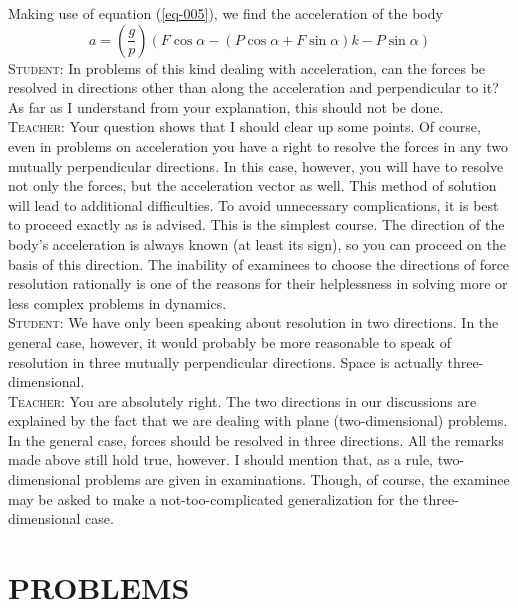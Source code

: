 \documentclass[a4paper,sfsidenotes]{tufte-book}
\begin{document}
Making use of equation (\ref{eq-005}), we find the acceleration of the body
\\
$$
a = \left( \frac{g}{p} \right) \left(F \cos \alpha - \left(P \cos \alpha + F \sin \alpha \right) k - P \sin \alpha \right) 
$$
\textsc{Student:} In problems of this kind dealing with acceleration, can the forces be resolved in directions other than along the acceleration and perpendicular to it? As far as I understand from your explanation, this should not be done.
\\
\textsc{Teacher:} Your question shows that I should clear up some points. Of course, even in problems on acceleration you have a right to resolve the forces in any two mutually perpendicular directions. In this case, however, you will have to resolve not only the forces, but the acceleration vector as well. This method of solution will lead to additional difficulties. To avoid unnecessary complications, it is best to proceed exactly as is advised. This is the simplest course. The direction of the body's acceleration is always known (at least its sign), so you can proceed on the basis of this direction. The inability of examinees to choose the directions of force resolution rationally is one of the reasons for their helplessness in solving more or less complex problems in dynamics.
\\
\textsc{Student:} We have only been speaking about resolution in two directions. In the general case, however, it would probably be more reasonable to speak of resolution in three mutually perpendicular directions. Space is actually three-dimensional.
\\
\textsc{Teacher:} You are absolutely right. The two directions in our discussions are explained by the fact that we are dealing with plane (two-dimensional) problems. In the general case, forces should be resolved in three directions. All the remarks made above still hold true, however. I should mention that, as a rule, two-dimensional problems are given in examinations. Though, of course, the examinee may be asked to make a not-too-complicated generalization for the three-dimensional case.
\newpage
\section{PROBLEMS}
\label{problems-02}
\end{document}
